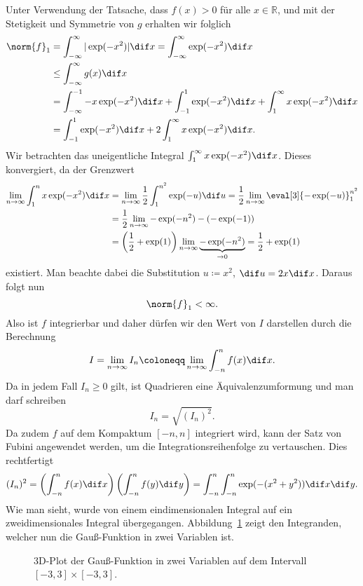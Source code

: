 \documentclass{scrartcl}
\newcommand{\R}{\mathbb{R}}
\begin{document}
Unter Verwendung der Tatsache, dass $ f(x) > 0 $ für alle $ x \in \R $, und mit der Stetigkeit und 
Symmetrie von $ g $ erhalten wir folglich
\begin{align*}
   \norm{f}_{1} 
&= \int_{-\infty}^{\infty} |\exp(-x^{2})| \dif x
 = \int_{-\infty}^{\infty} \exp(-x^{2}) \dif x \\
&\leq \int_{-\infty}^{\infty} g(x) \dif x \\
&= \int_{-\infty}^{-1} -x \exp(-x^{2}) \dif x 
   + \int_{-1}^{1} \exp(-x^{2}) \dif x
   + \int_{1}^{\infty} x \exp(-x^{2}) \dif x \\
&= \int_{-1}^{1} \exp(-x^{2}) \dif x + 2 \int_{1}^{\infty} x \exp(-x^{2}) \dif x.
\end{align*}
Wir betrachten das uneigentliche Integral $ \int_{1}^{\infty} x \exp(-x^{2}) \dif x $.
Dieses konvergiert, da der Grenzwert
\begin{align*}
   \lim\limits_{n \to \infty} \int_{1}^{n} x \exp(-x^{2}) \dif x
&= \lim\limits_{n \to \infty} \frac{1}{2} \int_{1}^{n^{2}} \exp(-u) \dif u
 = \frac{1}{2} \lim\limits_{n \to \infty} \eval[3]{-\exp(-u)}_{1}^{n^{2}} \\
&= \frac{1}{2} \lim\limits_{n \to \infty} - \exp(-n^{2}) - (-\exp(-1)) \\
&= \left( \frac{1}{2} + \exp(1) \right) 
      \lim\limits_{n \to \infty} \underbrace{-\exp(-n^{2})}_{\to 0}
 = \frac{1}{2} + \exp(1)
\end{align*}
existiert. Man beachte dabei die Substitution $ u \coloneqq x^{2} $, $ \dif u = 2x \dif x $. Daraus
folgt nun
\[
  \norm{f}_{1} < \infty.
\]
Also ist $ f $ integrierbar und daher dürfen wir den Wert von $ I $ darstellen durch die Berechnung
\[
  I = \lim\limits_{n \to \infty} I_{n} \coloneqq 
  \lim\limits_{n \to \infty} \int_{-n}^{n} f(x) \dif x.
\]
Da in jedem Fall $ I_{n} \geq 0 $ gilt, ist Quadrieren eine Äquivalenzumformung und man darf 
schreiben
\[
  I_{n} = \sqrt{ (I_{n})^{2} }.
\]
Da zudem $ f $ auf dem Kompaktum $ [-n, n] $ integriert wird, kann der Satz von Fubini angewendet
werden, um die Integrationsreihenfolge zu vertauschen. Dies rechtfertigt
\[
  (I_{n})^{2}
= \left( \int_{-n}^{n} f(x) \dif x \right) \left( \int_{-n}^{n} f(y) \dif y \right)
= \int_{-n}^{n} \int_{-n}^{n} \exp(-(x^{2} + y^{2})) \dif x \dif y.
\]
Wie man sieht, wurde von einem eindimensionalen Integral auf ein zweidimensionales Integral 
übergegangen. Abbildung~\ref{fig:gaussian3d} zeigt den Integranden, welcher nun die Gauß-Funktion
in zwei Variablen ist.
\begin{figure}[ht]
\centering
{}
\caption{3D-Plot der Gauß-Funktion in zwei Variablen auf dem Intervall $ [-3,3] \times [-3,3] $.}
\label{fig:gaussian3d}
\end{figure}
\end{document}
